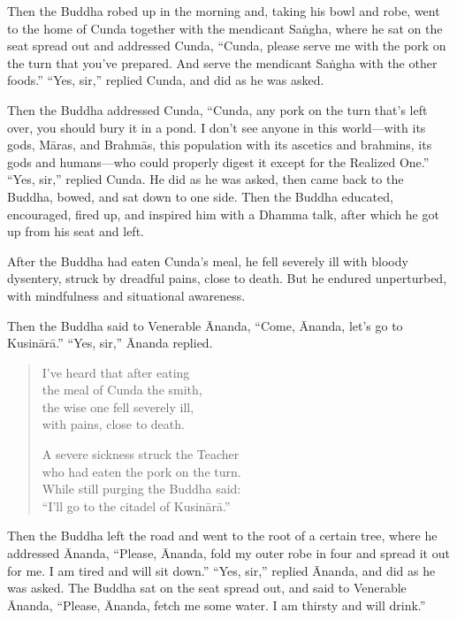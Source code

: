 \documentclass[12pt,openany]{book}%
\begin{document}
Then the Buddha robed up in the morning and, taking his bowl and robe, went to the home of Cunda together with the mendicant \textsanskrit{Saṅgha}, where he sat on the seat spread out and addressed Cunda, “Cunda, please serve me with the pork on the turn that you’ve prepared. And serve the mendicant \textsanskrit{Saṅgha} with the other foods.” “Yes, sir,” replied Cunda, and did as he was asked. 

Then the Buddha addressed Cunda, “Cunda, any pork on the turn that’s left over, you should bury it in a pond. I don’t see anyone in this world—with its gods, \textsanskrit{Māras}, and \textsanskrit{Brahmās}, this population with its ascetics and brahmins, its gods and humans—who could properly digest it except for the Realized One.” “Yes, sir,” replied Cunda. He did as he was asked, then came back to the Buddha, bowed, and sat down to one side. Then the Buddha educated, encouraged, fired up, and inspired him with a Dhamma talk, after which he got up from his seat and left. 

After the Buddha had eaten Cunda’s meal, he fell severely ill with bloody dysentery, struck by dreadful pains, close to death. But he endured unperturbed, with mindfulness and situational awareness. 

Then the Buddha said to Venerable Ānanda, “Come, Ānanda, let’s go to \textsanskrit{Kusinārā}.” “Yes, sir,” Ānanda replied. 

\begin{verse}%
I’ve heard that after eating \\
the meal of Cunda the smith, \\
the wise one fell severely ill, \\
with pains, close to death. 

A severe sickness struck the Teacher \\
who had eaten the pork on the turn. \\
While still purging the Buddha said: \\
“I’ll go to the citadel of \textsanskrit{Kusinārā}.” 

%
\end{verse}

Then the Buddha left the road and went to the root of a certain tree, where he addressed Ānanda, “Please, Ānanda, fold my outer robe in four and spread it out for me. I am tired and will sit down.” “Yes, sir,” replied Ānanda, and did as he was asked. The Buddha sat on the seat spread out, and said to Venerable Ānanda, “Please, Ānanda, fetch me some water. I am thirsty and will drink.” 
\end{document}
